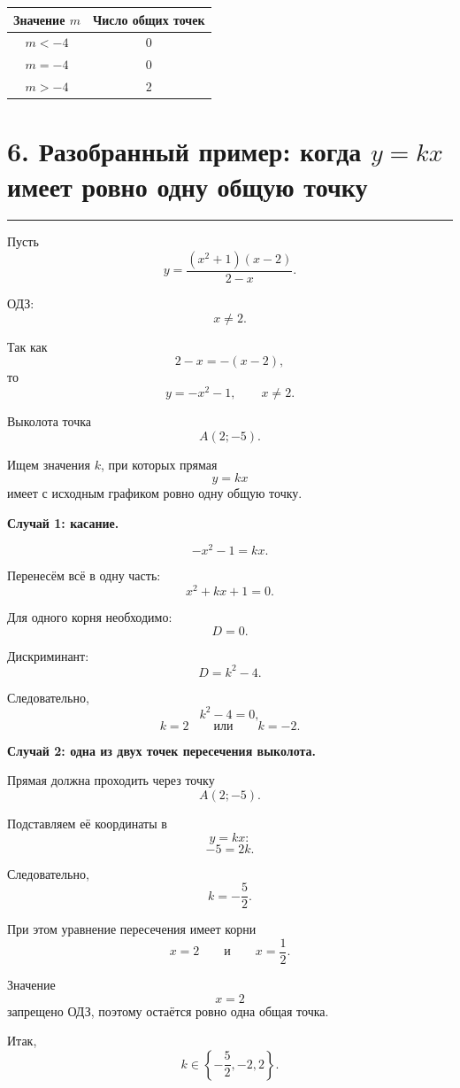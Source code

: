 \documentclass[a4paper,12pt]{article}
\newcommand{\sectionrule}{%
    \par
    \vspace{-0.4em}
    {\color{accent}\rule{\linewidth}{0.5pt}}
    \vspace{0.4em}
}
\begin{document}
\begin{center}
\begin{tabular}{cc}
\toprule
Значение $m$ & Число общих точек \\
\midrule
$m<-4$ & $0$ \\
$m=-4$ & $0$ \\
$m>-4$ & $2$ \\
\bottomrule
\end{tabular}
\end{center}


\section*{6. Разобранный пример: когда $y=kx$ имеет ровно одну общую точку}
\sectionrule

Пусть
\[
y=
\frac{(x^2+1)(x-2)}{2-x}.
\]

ОДЗ:
\[
x\ne2.
\]

Так как
\[
2-x=-(x-2),
\]
то
\[
y=-x^2-1,
\qquad
x\ne2.
\]

Выколота точка
\[
A(2;-5).
\]

Ищем значения $k$, при которых прямая
\[
y=kx
\]
имеет с исходным графиком ровно одну общую точку.

\textbf{Случай 1: касание.}

\[
-x^2-1=kx.
\]

Перенесём всё в одну часть:
\[
x^2+kx+1=0.
\]

Для одного корня необходимо:
\[
D=0.
\]

Дискриминант:
\[
D=k^2-4.
\]

Следовательно,
\[
k^2-4=0,
\]
\[
k=2
\qquad
\text{или}
\qquad
k=-2.
\]

\textbf{Случай 2: одна из двух точек пересечения выколота.}

Прямая должна проходить через точку
\[
A(2;-5).
\]

Подставляем её координаты в
\[
y=kx:
\]
\[
-5=2k.
\]

Следовательно,
\[
k=-\frac52.
\]

При этом уравнение пересечения имеет корни
\[
x=2
\qquad\text{и}\qquad
x=\frac12.
\]

Значение
\[
x=2
\]
запрещено ОДЗ, поэтому остаётся ровно одна общая точка.

Итак,
\[
\textbf{
$k\in
\left\{
-\dfrac52,
-2,
2
\right\}$.
}
\]
\end{document}
